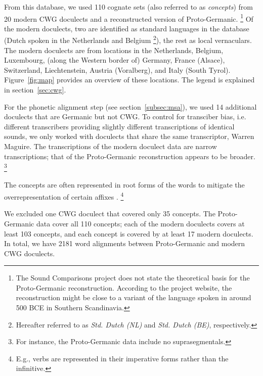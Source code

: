 \documentclass[a4paper]{article}
\begin{document}
From this database,
we used 110 cognate sets (also referred to as \textit{concepts})
from 20 modern CWG doculects
and a reconstructed version of Proto-Germanic.%
\footnote{%
The Sound Comparisons project does not state
the theoretical basis for the Proto-Germanic reconstruction.
According to the project website,
the reconstruction might be close to
a variant of the language spoken in around 500 BCE
in Southern Scandinavia.
}
Of the modern doculects, two are identified as standard languages
in the database (Dutch spoken in the Netherlands and Belgium%
\footnote{%
Hereafter referred to as \textit{Std. Dutch (NL)}
and \textit{Std. Dutch (BE)}, respectively.
}),
the rest as local vernaculars.
The modern doculects are from locations in the
Netherlands, Belgium, Luxembourg, (along the Western border of) Germany,
France (Alsace), Switzerland, Liechtenstein, Austria (Voralberg), and Italy (South Tyrol).
Figure~\ref{fig:map} provides an overview of these locations.
The legend is explained in section~\ref{sec:cwg}.

For the phonetic alignment step (see section~\ref{subsec:msa}),
we used 14 additional doculects that are Germanic but not CWG. 
To control for transciber bias,
i.e. different transcribers providing
slightly different transcriptions of identical sounds,
we only worked with doculects that share the same transcriptor,
Warren Maguire.
The transcriptions of the modern doculect data
are narrow transcriptions;
that of the Proto-Germanic reconstruction appears to be broader.%
\footnote{%
For instance, the Proto-Germanic data include no suprasegmentals.
}

The concepts are often represented in root forms
of the words to mitigate the overrepresentation
of certain affixes \citep{renfrew2009languages}.%
\footnote{%
E.g., verbs are represented in their imperative forms
rather than the infinitive.
}

We excluded one CWG doculect that covered only 35 concepts. %
The Proto-Germanic data cover all 110 concepts; each of the modern doculects covers at least 103 concepts, and each concept is covered by at least 17 modern doculects.
In total, we have 2181 word alignments between Proto-Germanic and modern CWG doculects.
\end{document}
